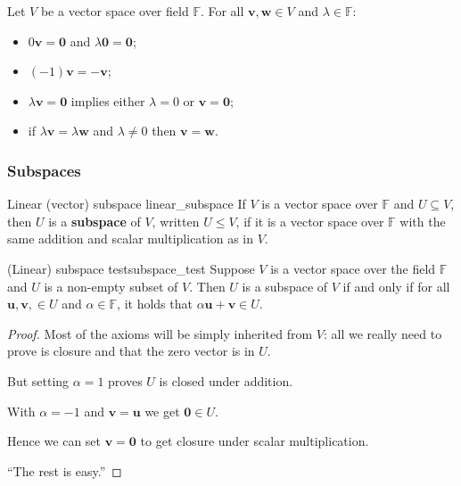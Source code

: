 \begin{lemma}{\cite{math2601_notes}}{}
Let $V$ be a vector space over field $\mathbb{F}$. For all $\mathbf{v}, \mathbf{w} \in V$ and $\lambda \in \mathbb{F}$:
\begin{itemize}
	\item $0 \mathbf{v} = \mathbf{0}$ and $\lambda \mathbf{0} = \mathbf{0}$;
	\item $(-1) \mathbf{v} = - \mathbf{v}$;\
	\item $\lambda \mathbf{v} = \mathbf{0}$ implies either $\lambda = 0$ or $\mathbf{v} = \mathbf{0}$;
	\item if $\lambda \mathbf{v} = \lambda \mathbf{w}$ and $\lambda \not = 0$ then $\mathbf{v} = \mathbf{w}$.
\end{itemize}
\end{lemma}

\subsubsection{Subspaces}

\begin{definition}{Linear (vector) subspace \cite{math2601_notes}}{linear_subspace}
If $V$ is a vector space over $\mathbb{F}$ and $U \subseteq V$, then $U$ is a \textbf{subspace} of $V$, written $U \leq V$, if it is a vector space over $\mathbb{F}$ with the same addition and scalar multiplication as in $V$.
\end{definition}

\begin{lemma}{(Linear) subspace test}{subspace_test}
Suppose $V$ is a vector space over the field $\mathbb{F}$ and $U$ is a non-empty subset of $V$. Then $U$ is a subspace of $V$ if and only if for all $\mathbf{u}, \mathbf{v}, \in U$ and $\alpha \in \mathbb{F}$, it holds that $\alpha \mathbf{u} + \mathbf{v} \in U$.

\begin{proof}
Most of the axioms will be simply inherited from $V$: all we really need to prove is closure and that the zero vector is in $U$.

But setting $\alpha = 1$ proves $U$ is closed under addition.

With $\alpha = -1$ and $\mathbf{v} = \mathbf{u}$ we get $\mathbf{0} \in U$.

Hence we can set $\mathbf{v} = \mathbf{0}$ to get closure under scalar multiplication.

``The rest is easy.''
\end{proof}
\end{lemma}

